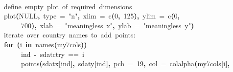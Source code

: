 \documentclass[a4paper]{article}
\newcommand{\hlnumber}[1]{\textcolor[rgb]{0.0823529411764706,0.0784313725490196,0.709803921568627}{#1}}%
\newcommand{\hlfunctioncall}[1]{\textcolor[rgb]{1,0,0}{#1}}%
\newcommand{\hlstring}[1]{\textcolor[rgb]{0.6,0.6,1}{#1}}%
\newcommand{\hlkeyword}[1]{\textcolor[rgb]{0,0,0}{\textbf{#1}}}%
\newcommand{\hlargument}[1]{\textcolor[rgb]{0.694117647058824,0.247058823529412,0.0196078431372549}{#1}}%
\newcommand{\hlcomment}[1]{\textcolor[rgb]{0.8,0.8,0.8}{#1}}%
\newcommand{\hlassignement}[1]{\textcolor[rgb]{0.215686274509804,0.215686274509804,0.384313725490196}{\textbf{#1}}}%
\newcommand{\hlsymbol}[1]{\textcolor[rgb]{0,0,0}{#1}}%
\newcommand{\hlprompt}[1]{\textcolor[rgb]{0,0,0}{#1}}%
\newcommand{\hlstd}[1]{\textcolor[rgb]{0,0,0}{#1}}%
\newenvironment{Houtput}{\raggedright}{%
%
}
\begin{document}
\begin{Houtput}
\hspace*{\fill}\\
\hlstd{}\ttfamily\noindent
\hlprompt{\usebox{\hlnormalsizeboxgreaterthan}{\ }}\hlcomment{\usebox{\hlnormalsizeboxhash}{\ }define{\ }empty{\ }plot{\ }of{\ }required{\ }dimensions}\mbox{}
\normalfont
\hspace*{\fill}\\
\hlstd{}\ttfamily\noindent
\hlprompt{\usebox{\hlnormalsizeboxgreaterthan}{\ }}\hlfunctioncall{plot}\hlkeyword{(}NULL\hlkeyword{,}{\ }\hlargument{type}{\ }\hlargument{=}{\ }\hlstring{"n"}\hlkeyword{,}{\ }\hlargument{xlim}{\ }\hlargument{=}{\ }\hlfunctioncall{c}\hlkeyword{(}\hlnumber{0}\hlkeyword{,}{\ }\hlnumber{125}\hlkeyword{)}\hlkeyword{,}{\ }\hlargument{ylim}{\ }\hlargument{=}{\ }\hlfunctioncall{c}\hlkeyword{(}\hlnumber{0}\hlkeyword{,}\hspace*{\fill}\\
\hlstd{}\hlprompt{{\ }}{\ }{\ }{\ }{\ }\hlnumber{700}\hlkeyword{)}\hlkeyword{,}{\ }\hlargument{xlab}{\ }\hlargument{=}{\ }\hlstring{"meaningless{\ }x"}\hlkeyword{,}{\ }\hlargument{ylab}{\ }\hlargument{=}{\ }\hlstring{"meaningless{\ }y"}\hlkeyword{)}\mbox{}
\normalfont
\hspace*{\fill}\\
\hlstd{}\ttfamily\noindent
\hlprompt{\usebox{\hlnormalsizeboxgreaterthan}{\ }}\hlcomment{\usebox{\hlnormalsizeboxhash}{\ }iterate{\ }over{\ }country{\ }names{\ }to{\ }add{\ }points:}\mbox{}
\normalfont
\hspace*{\fill}\\
\hlstd{}\ttfamily\noindent
\hlprompt{\usebox{\hlnormalsizeboxgreaterthan}{\ }}\hlkeyword{for}{\ }\hlkeyword{(}\hlsymbol{i}{\ }\hlkeyword{in}{\ }\hlfunctioncall{names}\hlkeyword{(}\hlsymbol{my7cols}\hlkeyword{)}\hlkeyword{)}{\ }\hlkeyword{\usebox{\hlnormalsizeboxopenbrace}}\hspace*{\fill}\\
\hlstd{}\hlprompt{{\ }}{\ }{\ }{\ }{\ }\hlsymbol{ind}{\ }\hlassignement{\usebox{\hlnormalsizeboxlessthan}-}{\ }\hlsymbol{sdat}\hlkeyword{\usebox{\hlnormalsizeboxdollar}}\hlsymbol{ctry}{\ }=={\ }\hlsymbol{i}\hspace*{\fill}\\
\hlstd{}\hlprompt{{\ }}{\ }{\ }{\ }{\ }\hlfunctioncall{points}\hlkeyword{(}\hlsymbol{sdat}\hlkeyword{\usebox{\hlnormalsizeboxdollar}}\hlsymbol{x}\hlkeyword{[}\hlsymbol{ind}\hlkeyword{]}\hlkeyword{,}{\ }\hlsymbol{sdat}\hlkeyword{\usebox{\hlnormalsizeboxdollar}}\hlsymbol{y}\hlkeyword{[}\hlsymbol{ind}\hlkeyword{]}\hlkeyword{,}{\ }\hlargument{pch}{\ }\hlargument{=}{\ }\hlnumber{19}\hlkeyword{,}{\ }\hlargument{col}{\ }\hlargument{=}{\ }\hlfunctioncall{colalpha}\hlkeyword{(}\hlsymbol{my7cols}\hlkeyword{[}\hlsymbol{i}\hlkeyword{]}\hlkeyword{,}\hspace*{\fill}\\

\end{Houtput}
\end{document}
